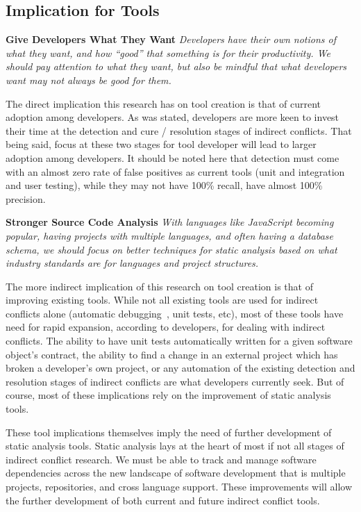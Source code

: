 \documentclass[conference]{IEEEtran}
\begin{document}
\subsection{Implication for Tools}
\label{sec:implt}

\textbf{Give Developers What They Want} \textit{Developers have their own notions of what they want, and how ``good''
that something is for their productivity. We should pay attention to what they want, but also be mindful that what
developers want may not always be good for them.}

The direct implication this research has on tool creation is that of current adoption among developers. As was stated,
developers are more keen to invest their time at the detection and cure / resolution stages of indirect conflicts. That being
said, focus at these two stages for tool developer will lead to larger adoption among developers.
It should be noted here that detection must come with an almost zero rate of false positives as
current tools (unit and integration and user testing), while they may not have 100\% recall, have almost 100\% precision.

\textbf{Stronger Source Code Analysis} \textit{With languages like JavaScript becoming popular, having projects with
multiple languages, and often having a database schema, we should focus on better techniques for static analysis based
on what industry standards are for languages and project structures.}

The more indirect implication of this research on tool creation is that of improving existing tools. While not all existing
tools are used for indirect conflicts alone (automatic debugging~\cite{Zeller:2005:WPF}, unit tests, etc), most of these tools
have need for rapid expansion, according to developers, for dealing with indirect conflicts. The ability to have unit tests
automatically written for a given software object's contract, the ability to find a change  in an external project
which has broken a developer's own project, or any automation of the existing detection and resolution stages of indirect
conflicts are what developers currently seek. But of course, most of these implications rely on the improvement of
static analysis tools.

These tool implications themselves imply the need of further development of static analysis tools. Static
analysis lays at the heart of most if not all stages of indirect conflict research. We must be able to track and manage
software dependencies across the new landscape of software development that is multiple projects, repositories, and cross
language support. These improvements will allow the further development of both current and future indirect conflict
tools.
\end{document}
